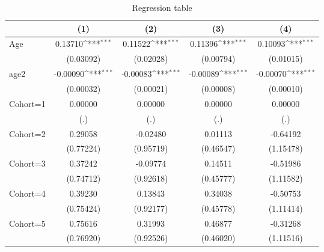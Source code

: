 \begin{table}[htbp]\centering
\def\sym#1{\ifmmode^{#1}\else\(^{#1}\)\fi}
\caption{Regression table \label{reg2}}
\begin{tabular}{l*{4}{c}}
\toprule
                    &\multicolumn{1}{c}{(1)}         &\multicolumn{1}{c}{(2)}         &\multicolumn{1}{c}{(3)}         &\multicolumn{1}{c}{(4)}         \\
\midrule
Age                 &     0.13710\sym{***}&     0.11522\sym{***}&     0.11396\sym{***}&     0.10093\sym{***}\\
                    &   (0.03092)         &   (0.02028)         &   (0.00794)         &   (0.01015)         \\
\addlinespace
age2                &    -0.00090\sym{***}&    -0.00083\sym{***}&    -0.00089\sym{***}&    -0.00070\sym{***}\\
                    &   (0.00032)         &   (0.00021)         &   (0.00008)         &   (0.00010)         \\
\addlinespace
Cohort=1            &     0.00000         &     0.00000         &     0.00000         &     0.00000         \\
                    &         (.)         &         (.)         &         (.)         &         (.)         \\
\addlinespace
Cohort=2            &     0.29058         &    -0.02480         &     0.01113         &    -0.64192         \\
                    &   (0.77224)         &   (0.95719)         &   (0.46547)         &   (1.15478)         \\
\addlinespace
Cohort=3            &     0.37242         &    -0.09774         &     0.14511         &    -0.51986         \\
                    &   (0.74712)         &   (0.92618)         &   (0.45777)         &   (1.11582)         \\
\addlinespace
Cohort=4            &     0.39230         &     0.13843         &     0.34038         &    -0.50753         \\
                    &   (0.75424)         &   (0.92177)         &   (0.45778)         &   (1.11414)         \\
\addlinespace
Cohort=5            &     0.75616         &     0.31993         &     0.46877         &    -0.31268         \\
                    &   (0.76920)         &   (0.92526)         &   (0.46020)         &   (1.11516)         \\

\end{tabular}
\end{table}
